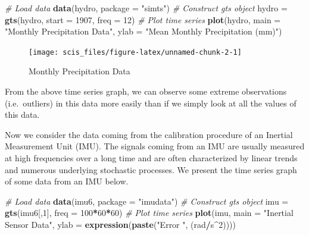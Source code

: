 \documentclass[]{book}
\newenvironment{Shaded}{\begin{snugshade}}{\end{snugshade}}
\newcommand{\CommentTok}[1]{\textcolor[rgb]{0.56,0.35,0.01}{\textit{#1}}}
\newcommand{\DataTypeTok}[1]{\textcolor[rgb]{0.13,0.29,0.53}{#1}}
\newcommand{\DecValTok}[1]{\textcolor[rgb]{0.00,0.00,0.81}{#1}}
\newcommand{\KeywordTok}[1]{\textcolor[rgb]{0.13,0.29,0.53}{\textbf{#1}}}
\newcommand{\NormalTok}[1]{#1}
\newcommand{\OperatorTok}[1]{\textcolor[rgb]{0.81,0.36,0.00}{\textbf{#1}}}
\newcommand{\StringTok}[1]{\textcolor[rgb]{0.31,0.60,0.02}{#1}}
\theoremstyle{definition}
\theoremstyle{definition}
\theoremstyle{definition}
\theoremstyle{remark}
\let\BeginKnitrBlock\begin \let\EndKnitrBlock\end
\begin{document}
\begin{Shaded}
\begin{Highlighting}[]
\CommentTok{# Load data}
\KeywordTok{data}\NormalTok{(hydro, }\DataTypeTok{package =} \StringTok{"simts"}\NormalTok{)}
\CommentTok{# Construct gts object}
\NormalTok{hydro =}\StringTok{ }\KeywordTok{gts}\NormalTok{(hydro, }\DataTypeTok{start =} \DecValTok{1907}\NormalTok{, }\DataTypeTok{freq =} \DecValTok{12}\NormalTok{)}
\CommentTok{# Plot time series}
\KeywordTok{plot}\NormalTok{(hydro, }\DataTypeTok{main =} \StringTok{"Monthly Precipitation Data"}\NormalTok{,}
     \DataTypeTok{ylab =} \StringTok{"Mean Monthly Precipitation (mm)"}\NormalTok{)}
\end{Highlighting}
\end{Shaded}

\begin{figure}

{\centering \texttt{[image: scis\_files/figure-latex/unnamed-chunk-2-1]} 

}

\caption{Monthly Precipitation Data}\label{fig:unnamed-chunk-2}
\end{figure}

From the above time series graph, we can observe some extreme
observations (i.e.~outliers) in this data more easily than if we simply
look at all the values of this data.

\BeginKnitrBlock{example}[Inertial Sensor Data]
\protect\hypertarget{exm:exampleInertialSensor}{}{\label{exm:exampleInertialSensor}
{} }Now we consider the data coming
from the calibration procedure of an Inertial Measurement Unit (IMU).
The signals coming from an IMU are usually measured at high frequencies
over a long time and are often characterized by linear trends and
numerous underlying stochastic processes. We present the time series
graph of some data from an IMU below.
\EndKnitrBlock{example}

\begin{Shaded}
\begin{Highlighting}[]
\CommentTok{# Load data}
\KeywordTok{data}\NormalTok{(imu6, }\DataTypeTok{package =} \StringTok{"imudata"}\NormalTok{)}
\CommentTok{# Construct gts object}
\NormalTok{imu =}\StringTok{ }\KeywordTok{gts}\NormalTok{(imu6[,}\DecValTok{1}\NormalTok{], }\DataTypeTok{freq =} \DecValTok{100}\OperatorTok{*}\DecValTok{60}\OperatorTok{*}\DecValTok{60}\NormalTok{)}
\CommentTok{# Plot time series}
\KeywordTok{plot}\NormalTok{(imu, }\DataTypeTok{main =} \StringTok{"Inertial Sensor Data"}\NormalTok{,}
     \DataTypeTok{ylab =} \KeywordTok{expression}\NormalTok{(}\KeywordTok{paste}\NormalTok{(}\StringTok{"Error "}\NormalTok{, (rad}\OperatorTok{/}\NormalTok{s}\OperatorTok{^}\DecValTok{2}\NormalTok{))))}
\end{Highlighting}
\end{Shaded}
\end{document}
